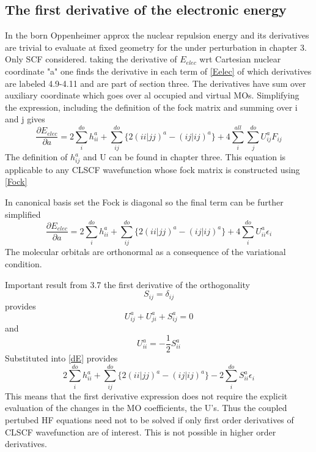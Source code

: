 	\subsection{The first derivative of the electronic energy}
		In the born Oppenheimer approx the nuclear repulsion energy and its derivatives are trivial to evaluate at fixed geometry for the under perturbation in chapter 3.  Only SCF considered.  taking the derivative of $E_{elec}$ wrt Cartesian nuclear coordinate "a" one finds the derivative in each term of \cref{Eelec} of which derivatives are labeled 4.9-4.11 and are part of section three. The derivatives have sum over auxiliary coordinate which goes over al occupied and virtual MOs.  Simplifying the expression, including the definition of the fock matrix and summing over i and j gives
			\begin{equation}\label{dE}
				\frac{\partial E_{elec}}{\partial a} = 2 \sum_i^{do} h^a_{ii} + \sum_{ij}^{do} \{2 (ii|jj)^a - (ij|ij)^a\} + 4 \sum_i^{all}\sum_j^{do} U_{ij}^a F_{ij}
			\end{equation}
		The definition of $h^a_{ij}$ and U can be found in chapter three.  This equation is applicable to any CLSCF wavefunction whose fock matrix is constructed using \cref{Fock}

		In canonical basis set the Fock is diagonal so the final term can be further simplified
			\begin{equation}
				\frac{\partial E_{elec}}{\partial a} = 2 \sum_i^{do} h^a_{ii} + \sum_{ij}^{do} \{2 (ii|jj)^a - (ij|ij)^a\} + 4 \sum_i^{do} U_{ii}^a \epsilon_i
			\end{equation}
		The molecular orbitals are orthonormal as a consequence of the variational condition.

		Important result from 3.7 the first derivative of the orthogonality 
			\begin{equation}
				S_{ij} = \delta_{ij}
			\end{equation}
		provides
			\begin{equation}
				U^a_{ij} + U^{a}_{ji} + S^a_{ij} = 0
			\end{equation}
		and
			\begin{equation}
				U^{a}_{ii} = -\frac{1}{2} S^a_{ii}
			\end{equation}
		Substituted into \cref{dE} provides
			\begin{equation}
				2\sum_i^{do} h^a_{ii} + \sum_{ij}^{do}\{2(ii|jj)^a - (ij|ij)^a\} - 2 \sum_i^{do}S^a_{ii} \epsilon_i
			\end{equation}
		This means that the first derivative expression does not require the explicit evaluation of the changes in the MO coefficients, the U's.  Thus the coupled pertubed HF equations need not to be solved if only first order derivatives of CLSCF wavefunction are of interest.  This is not possible in higher order derivatives.

